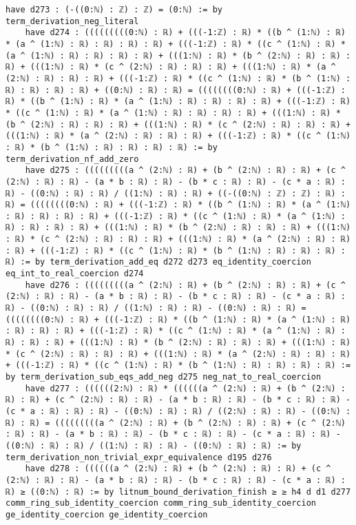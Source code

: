 \documentclass{article}
\begin{document}
\begin{tcolorbox}[colback=white!10, width=\linewidth]
\begin{lstlisting}[language=Lean4]
    have d273 : (-((0:ℕ) : ℤ) : ℤ) = (0:ℕ) := by term_derivation_neg_literal
    have d274 : (((((((((0:ℕ) : ℝ) + (((-1:ℤ) : ℝ) * ((b ^ (1:ℕ) : ℝ) * (a ^ (1:ℕ) : ℝ) : ℝ) : ℝ) : ℝ) + (((-1:ℤ) : ℝ) * ((c ^ (1:ℕ) : ℝ) * (a ^ (1:ℕ) : ℝ) : ℝ) : ℝ) : ℝ) + (((1:ℕ) : ℝ) * (b ^ (2:ℕ) : ℝ) : ℝ) : ℝ) + (((1:ℕ) : ℝ) * (c ^ (2:ℕ) : ℝ) : ℝ) : ℝ) + (((1:ℕ) : ℝ) * (a ^ (2:ℕ) : ℝ) : ℝ) : ℝ) + (((-1:ℤ) : ℝ) * ((c ^ (1:ℕ) : ℝ) * (b ^ (1:ℕ) : ℝ) : ℝ) : ℝ) : ℝ) + ((0:ℕ) : ℝ) : ℝ) = ((((((((0:ℕ) : ℝ) + (((-1:ℤ) : ℝ) * ((b ^ (1:ℕ) : ℝ) * (a ^ (1:ℕ) : ℝ) : ℝ) : ℝ) : ℝ) + (((-1:ℤ) : ℝ) * ((c ^ (1:ℕ) : ℝ) * (a ^ (1:ℕ) : ℝ) : ℝ) : ℝ) : ℝ) + (((1:ℕ) : ℝ) * (b ^ (2:ℕ) : ℝ) : ℝ) : ℝ) + (((1:ℕ) : ℝ) * (c ^ (2:ℕ) : ℝ) : ℝ) : ℝ) + (((1:ℕ) : ℝ) * (a ^ (2:ℕ) : ℝ) : ℝ) : ℝ) + (((-1:ℤ) : ℝ) * ((c ^ (1:ℕ) : ℝ) * (b ^ (1:ℕ) : ℝ) : ℝ) : ℝ) : ℝ) := by term_derivation_nf_add_zero
    have d275 : (((((((((a ^ (2:ℕ) : ℝ) + (b ^ (2:ℕ) : ℝ) : ℝ) + (c ^ (2:ℕ) : ℝ) : ℝ) - (a * b : ℝ) : ℝ) - (b * c : ℝ) : ℝ) - (c * a : ℝ) : ℝ) - ((0:ℕ) : ℝ) : ℝ) / ((1:ℕ) : ℝ) : ℝ) + ((-((0:ℕ) : ℤ) : ℤ) : ℝ) : ℝ) = ((((((((0:ℕ) : ℝ) + (((-1:ℤ) : ℝ) * ((b ^ (1:ℕ) : ℝ) * (a ^ (1:ℕ) : ℝ) : ℝ) : ℝ) : ℝ) + (((-1:ℤ) : ℝ) * ((c ^ (1:ℕ) : ℝ) * (a ^ (1:ℕ) : ℝ) : ℝ) : ℝ) : ℝ) + (((1:ℕ) : ℝ) * (b ^ (2:ℕ) : ℝ) : ℝ) : ℝ) + (((1:ℕ) : ℝ) * (c ^ (2:ℕ) : ℝ) : ℝ) : ℝ) + (((1:ℕ) : ℝ) * (a ^ (2:ℕ) : ℝ) : ℝ) : ℝ) + (((-1:ℤ) : ℝ) * ((c ^ (1:ℕ) : ℝ) * (b ^ (1:ℕ) : ℝ) : ℝ) : ℝ) : ℝ) := by term_derivation_add_eq d272 d273 eq_identity_coercion eq_int_to_real_coercion d274
    have d276 : (((((((((a ^ (2:ℕ) : ℝ) + (b ^ (2:ℕ) : ℝ) : ℝ) + (c ^ (2:ℕ) : ℝ) : ℝ) - (a * b : ℝ) : ℝ) - (b * c : ℝ) : ℝ) - (c * a : ℝ) : ℝ) - ((0:ℕ) : ℝ) : ℝ) / ((1:ℕ) : ℝ) : ℝ) - ((0:ℕ) : ℝ) : ℝ) = ((((((((0:ℕ) : ℝ) + (((-1:ℤ) : ℝ) * ((b ^ (1:ℕ) : ℝ) * (a ^ (1:ℕ) : ℝ) : ℝ) : ℝ) : ℝ) + (((-1:ℤ) : ℝ) * ((c ^ (1:ℕ) : ℝ) * (a ^ (1:ℕ) : ℝ) : ℝ) : ℝ) : ℝ) + (((1:ℕ) : ℝ) * (b ^ (2:ℕ) : ℝ) : ℝ) : ℝ) + (((1:ℕ) : ℝ) * (c ^ (2:ℕ) : ℝ) : ℝ) : ℝ) + (((1:ℕ) : ℝ) * (a ^ (2:ℕ) : ℝ) : ℝ) : ℝ) + (((-1:ℤ) : ℝ) * ((c ^ (1:ℕ) : ℝ) * (b ^ (1:ℕ) : ℝ) : ℝ) : ℝ) : ℝ) := by term_derivation_sub_eqs_add_neg d275 neg_nat_to_real_coercion
    have d277 : ((((((2:ℕ) : ℝ) * ((((((a ^ (2:ℕ) : ℝ) + (b ^ (2:ℕ) : ℝ) : ℝ) + (c ^ (2:ℕ) : ℝ) : ℝ) - (a * b : ℝ) : ℝ) - (b * c : ℝ) : ℝ) - (c * a : ℝ) : ℝ) : ℝ) - ((0:ℕ) : ℝ) : ℝ) / ((2:ℕ) : ℝ) : ℝ) - ((0:ℕ) : ℝ) : ℝ) = (((((((((a ^ (2:ℕ) : ℝ) + (b ^ (2:ℕ) : ℝ) : ℝ) + (c ^ (2:ℕ) : ℝ) : ℝ) - (a * b : ℝ) : ℝ) - (b * c : ℝ) : ℝ) - (c * a : ℝ) : ℝ) - ((0:ℕ) : ℝ) : ℝ) / ((1:ℕ) : ℝ) : ℝ) - ((0:ℕ) : ℝ) : ℝ) := by term_derivation_non_trivial_expr_equivalence d195 d276
    have d278 : ((((((a ^ (2:ℕ) : ℝ) + (b ^ (2:ℕ) : ℝ) : ℝ) + (c ^ (2:ℕ) : ℝ) : ℝ) - (a * b : ℝ) : ℝ) - (b * c : ℝ) : ℝ) - (c * a : ℝ) : ℝ) ≥ ((0:ℕ) : ℝ) := by litnum_bound_derivation_finish ≥ ≥ h4 d d1 d277 comm_ring_sub_identity_coercion comm_ring_sub_identity_coercion ge_identity_coercion ge_identity_coercion

\end{lstlisting}
\end{tcolorbox}
\end{document}
